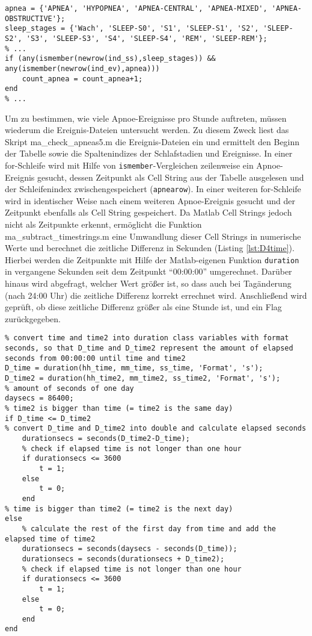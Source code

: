 \begin{lstlisting}[caption={Implementierung Kriterium D4 in Skript ma\_count\_apneas.m}, label={lst:D4}]
apnea = {'APNEA', 'HYPOPNEA', 'APNEA-CENTRAL', 'APNEA-MIXED', 'APNEA-OBSTRUCTIVE'};
sleep_stages = {'Wach', 'SLEEP-S0', 'S1', 'SLEEP-S1', 'S2', 'SLEEP-S2', 'S3', 'SLEEP-S3', 'S4', 'SLEEP-S4', 'REM', 'SLEEP-REM'};
% ...
if (any(ismember(newrow(ind_ss),sleep_stages)) && any(ismember(newrow(ind_ev),apnea)))
    count_apnea = count_apnea+1;
end
% ...
\end{lstlisting}

Um zu bestimmen, wie viele Apnoe-Ereignisse pro Stunde auftreten, müssen wiederum die Ereignis-Dateien untersucht werden. Zu diesem Zweck liest das Skript ma\_check\_apneas5.m die Ereignis-Dateien ein und ermittelt den Beginn der Tabelle sowie die Spaltenindizes der Schlafstadien und Ereignisse. In einer for-Schleife wird mit Hilfe von \texttt{ismember}-Vergleichen zeilenweise ein Apnoe-Ereignis gesucht, dessen Zeitpunkt als Cell String aus der Tabelle ausgelesen und der Schleifenindex zwischengespeichert (\texttt{apnearow}). In einer weiteren for-Schleife wird in identischer Weise nach einem weiteren Apnoe-Ereignis gesucht und der Zeitpunkt ebenfalls als Cell String gespeichert. Da Matlab Cell Strings jedoch nicht als Zeitpunkte erkennt, ermöglicht die Funktion ma\_subtract\_timestrings.m eine Umwandlung dieser Cell Strings in numerische Werte und berechnet die zeitliche Differenz in Sekunden (Listing \ref{lst:D4time}). Hierbei werden die Zeitpunkte mit Hilfe der Matlab-eigenen Funktion \texttt{duration} in vergangene Sekunden seit dem Zeitpunkt "`00:00:00"' umgerechnet. Darüber hinaus wird abgefragt, welcher Wert größer ist, so dass auch bei Tagänderung (nach 24:00 Uhr) die zeitliche Differenz korrekt errechnet wird. Anschließend wird geprüft, ob diese zeitliche Differenz größer als eine Stunde ist, und ein Flag zurückgegeben.\\

\begin{lstlisting}[caption={Implementierung Kriterium D4 in Funktion ma\_subtract\_timestrings.m}, label={lst:D4time}]
% ...
% convert time and time2 into duration class variables with format seconds, so that D_time and D_time2 represent the amount of elapsed seconds from 00:00:00 until time and time2
D_time = duration(hh_time, mm_time, ss_time, 'Format', 's');
D_time2 = duration(hh_time2, mm_time2, ss_time2, 'Format', 's');
% amount of seconds of one day
daysecs = 86400;
% time2 is bigger than time (= time2 is the same day)
if D_time <= D_time2
% convert D_time and D_time2 into double and calculate elapsed seconds
	durationsecs = seconds(D_time2-D_time);
    % check if elapsed time is not longer than one hour
    if durationsecs <= 3600
    	t = 1;
    else
        t = 0;
    end
% time is bigger than time2 (= time2 is the next day)
else
    % calculate the rest of the first day from time and add the elapsed time of time2
    durationsecs = seconds(daysecs - seconds(D_time));
    durationsecs = seconds(durationsecs + D_time2);
    % check if elapsed time is not longer than one hour
    if durationsecs <= 3600
        t = 1;
    else
        t = 0;
    end
end
\end{lstlisting}

